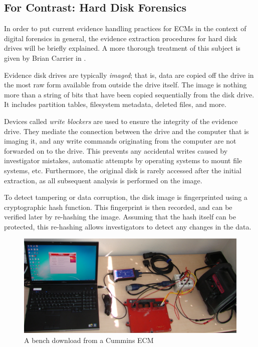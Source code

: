 \subsection{For Contrast: Hard Disk Forensics}

In order to put current evidence handling practices for ECMs in the context of digital forensics in general, the evidence extraction
procedures for hard disk drives will be briefly explained. A more thorough treatment of this subject is given by Brian Carrier in \cite{carrier2005}.

Evidence disk drives are typically \emph{imaged}; that is, data are copied off the drive in the most raw form available from outside
the drive itself. The image is nothing more than a string of bits that have been copied sequentially from the disk drive. It includes
partition tables, filesystem metadata, deleted files, and more.

Devices called \emph{write blockers} are used to ensure the integrity of the evidence drive\cite{carrier2005}. They mediate the connection between the
drive and the computer that is imaging it, and any write commands originating from the computer are not forwarded on to the drive.
This prevents any accidental writes caused by investigator mistakes, automatic attempts by operating systems to mount file systems, etc.
Furthermore, the original disk is rarely accessed after the initial extraction, as all subsequent analysis is performed on the image.

To detect tampering or data corruption, the disk image is fingerprinted using a cryptographic hash function. This fingerprint is then recorded,
and can be verified later by re-hashing the image. Assuming that the hash itself can be protected, this re-hashing allows investigators to
detect any changes in the data.

\begin{figure}[h]

  \includegraphics[scale=0.5]{cumminsbench}
  \caption{A bench download from a Cummins ECM}
  \label{fig:cumminsbench}
\end{figure}

